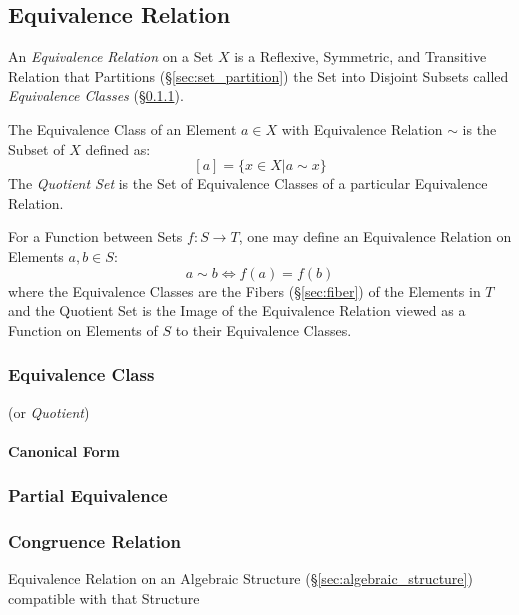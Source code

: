 \subsection{Equivalence Relation}\label{sec:equivalence_relation}

An \emph{Equivalence Relation} on a Set $X$ is a Reflexive, Symmetric,
and Transitive Relation that Partitions (\S\ref{sec:set_partition})
the Set into Disjoint Subsets called \emph{Equivalence Classes}
(\S\ref{sec:equivalence_class}).

The Equivalence Class of an Element $a \in X$ with Equivalence
Relation $\sim$ is the Subset of $X$ defined as:
\[
    [a] = \{x \in X | a \sim x\}
\]
The \emph{Quotient Set} is the Set of Equivalence Classes of a
particular Equivalence Relation.

For a Function between Sets $f : S \rightarrow T$, one may define an
Equivalence Relation on Elements $a,b \in S$:
\[
    a \sim b \Leftrightarrow f(a) = f(b)
\]
where the Equivalence Classes are the Fibers (\S\ref{sec:fiber}) of
the Elements in $T$ and the Quotient Set is the Image of the
Equivalence Relation viewed as a Function on Elements of $S$ to their
Equivalence Classes.



\subsubsection{Equivalence Class}\label{sec:equivalence_class}

(or \emph{Quotient})



\paragraph{Canonical Form}\label{sec:canonical_form}



\subsubsection{Partial Equivalence}\label{sec:partial_equivalence}

\subsubsection{Congruence Relation}\label{sec:congruence_relation}

Equivalence Relation on an Algebraic Structure
(\S\ref{sec:algebraic_structure}) compatible with that Structure



